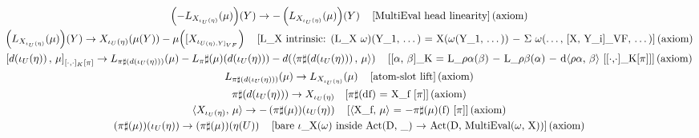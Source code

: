 \documentclass[11pt]{article}
\begin{document}
    {\allowdisplaybreaks\scriptsize
\begin{gather*}
\left(-L_{X_{\iota_U(\eta)}}\!\left(\mu\right)\right)\!\left(Y\right) \to -\left(L_{X_{\iota_U(\eta)}}\!\left(\mu\right)\right)\!\left(Y\right) \quad \text{[MultiEval head linearity]\,(axiom)} \\
\left(L_{X_{\iota_U(\eta)}}\!\left(\mu\right)\right)\!\left(Y\right) \to X_{\iota_U(\eta)}\!\left(\mu\!\left(Y\right)\right) - \mu\!\left([X_{\iota_{U(\eta),Y]_{VF}}}\right) \quad \text{[L\_X intrinsic: (L\_X \ensuremath{\omega})(Y\_1, \ensuremath{\dots}) = X(\ensuremath{\omega}(Y\_1, \ensuremath{\dots})) \ensuremath{-} \ensuremath{\Sigma} \ensuremath{\omega}(\ensuremath{\dots}, [X, Y\_i]\_VF, \ensuremath{\dots})]\,(axiom)} \\
\left[d\!\left(\iota_U\!\left(\eta\right)\right),\, \mu\right]_{[\cdot,\cdot]_K[\pi]} \to L_{\pi\sharp(d(\iota_U(\eta)))}\!\left(\mu\right) - L_\pi\sharp(\mu)\!\left(d\!\left(\iota_U\!\left(\eta\right)\right)\right) - d\!\left(\langle \pi\sharp\!\left(d\!\left(\iota_U\!\left(\eta\right)\right)\right),\, \mu \rangle\right) \quad \text{[[\ensuremath{\alpha}, \ensuremath{\beta}]\_K = L\_\ensuremath{\rho}\ensuremath{\alpha}(\ensuremath{\beta}) \ensuremath{-} L\_\ensuremath{\rho}\ensuremath{\beta}(\ensuremath{\alpha}) \ensuremath{-} d\ensuremath{\langle}\ensuremath{\rho}\ensuremath{\alpha}, \ensuremath{\beta}\ensuremath{\rangle} [[\ensuremath{\cdot},\ensuremath{\cdot}]\_K[\ensuremath{\pi}]]]\,(axiom)} \\
L_{\pi\sharp(d(\iota_U(\eta)))}\!\left(\mu\right) \to L_{X_{\iota_U(\eta)}}\!\left(\mu\right) \quad \text{[atom-slot lift]\,(axiom)} \\
\pi\sharp\!\left(d\!\left(\iota_U\!\left(\eta\right)\right)\right) \to X_{\iota_U(\eta)} \quad \text{[\ensuremath{\pi}\ensuremath{\sharp}(df) = X\_f [\ensuremath{\pi}]]\,(axiom)} \\
\langle X_{\iota_U(\eta)},\, \mu \rangle \to -\left(\pi\sharp\!\left(\mu\right)\right)\!\left(\iota_U\!\left(\eta\right)\right) \quad \text{[\ensuremath{\langle}X\_f, \ensuremath{\mu}\ensuremath{\rangle} = \ensuremath{-}\ensuremath{\pi}\ensuremath{\sharp}(\ensuremath{\mu})(f) [\ensuremath{\pi}]]\,(axiom)} \\
\left(\pi\sharp\!\left(\mu\right)\right)\!\left(\iota_U\!\left(\eta\right)\right) \to \left(\pi\sharp\!\left(\mu\right)\right)\!\left(\eta\!\left(U\right)\right) \quad \text{[bare \ensuremath{\iota}\_X(\ensuremath{\omega}) inside Act(D, \_) \ensuremath{\to} Act(D, MultiEval(\ensuremath{\omega}, X))]\,(axiom)} \\

\end{gather*}}
\end{document}
